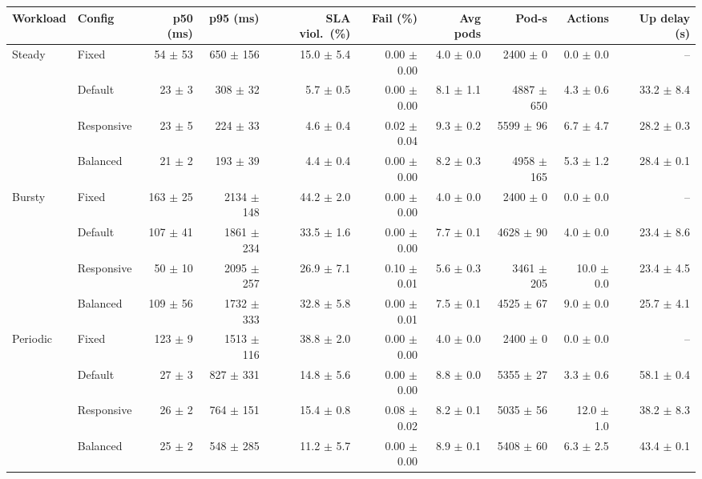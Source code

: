 \begin{tabular}{llrrrrrrrr}
\toprule
Workload & Config & p50 (ms) & p95 (ms) & SLA viol.\ (\%) & Fail (\%) & Avg pods & Pod-s & Actions & Up delay (s) \\
\midrule
Steady & Fixed & 54 $\pm$ 53 & 650 $\pm$ 156 & 15.0 $\pm$ 5.4 & 0.00 $\pm$ 0.00 & 4.0 $\pm$ 0.0 & 2400 $\pm$ 0 & 0.0 $\pm$ 0.0 & -- \\
 & Default & 23 $\pm$ 3 & 308 $\pm$ 32 & 5.7 $\pm$ 0.5 & 0.00 $\pm$ 0.00 & 8.1 $\pm$ 1.1 & 4887 $\pm$ 650 & 4.3 $\pm$ 0.6 & 33.2 $\pm$ 8.4 \\
 & Responsive & 23 $\pm$ 5 & 224 $\pm$ 33 & 4.6 $\pm$ 0.4 & 0.02 $\pm$ 0.04 & 9.3 $\pm$ 0.2 & 5599 $\pm$ 96 & 6.7 $\pm$ 4.7 & 28.2 $\pm$ 0.3 \\
 & Balanced & 21 $\pm$ 2 & 193 $\pm$ 39 & 4.4 $\pm$ 0.4 & 0.00 $\pm$ 0.00 & 8.2 $\pm$ 0.3 & 4958 $\pm$ 165 & 5.3 $\pm$ 1.2 & 28.4 $\pm$ 0.1 \\
\midrule
Bursty & Fixed & 163 $\pm$ 25 & 2134 $\pm$ 148 & 44.2 $\pm$ 2.0 & 0.00 $\pm$ 0.00 & 4.0 $\pm$ 0.0 & 2400 $\pm$ 0 & 0.0 $\pm$ 0.0 & -- \\
 & Default & 107 $\pm$ 41 & 1861 $\pm$ 234 & 33.5 $\pm$ 1.6 & 0.00 $\pm$ 0.00 & 7.7 $\pm$ 0.1 & 4628 $\pm$ 90 & 4.0 $\pm$ 0.0 & 23.4 $\pm$ 8.6 \\
 & Responsive & 50 $\pm$ 10 & 2095 $\pm$ 257 & 26.9 $\pm$ 7.1 & 0.10 $\pm$ 0.01 & 5.6 $\pm$ 0.3 & 3461 $\pm$ 205 & 10.0 $\pm$ 0.0 & 23.4 $\pm$ 4.5 \\
 & Balanced & 109 $\pm$ 56 & 1732 $\pm$ 333 & 32.8 $\pm$ 5.8 & 0.00 $\pm$ 0.01 & 7.5 $\pm$ 0.1 & 4525 $\pm$ 67 & 9.0 $\pm$ 0.0 & 25.7 $\pm$ 4.1 \\
\midrule
Periodic & Fixed & 123 $\pm$ 9 & 1513 $\pm$ 116 & 38.8 $\pm$ 2.0 & 0.00 $\pm$ 0.00 & 4.0 $\pm$ 0.0 & 2400 $\pm$ 0 & 0.0 $\pm$ 0.0 & -- \\
 & Default & 27 $\pm$ 3 & 827 $\pm$ 331 & 14.8 $\pm$ 5.6 & 0.00 $\pm$ 0.00 & 8.8 $\pm$ 0.0 & 5355 $\pm$ 27 & 3.3 $\pm$ 0.6 & 58.1 $\pm$ 0.4 \\
 & Responsive & 26 $\pm$ 2 & 764 $\pm$ 151 & 15.4 $\pm$ 0.8 & 0.08 $\pm$ 0.02 & 8.2 $\pm$ 0.1 & 5035 $\pm$ 56 & 12.0 $\pm$ 1.0 & 38.2 $\pm$ 8.3 \\
 & Balanced & 25 $\pm$ 2 & 548 $\pm$ 285 & 11.2 $\pm$ 5.7 & 0.00 $\pm$ 0.00 & 8.9 $\pm$ 0.1 & 5408 $\pm$ 60 & 6.3 $\pm$ 2.5 & 43.4 $\pm$ 0.1 \\
\bottomrule
\end{tabular}
